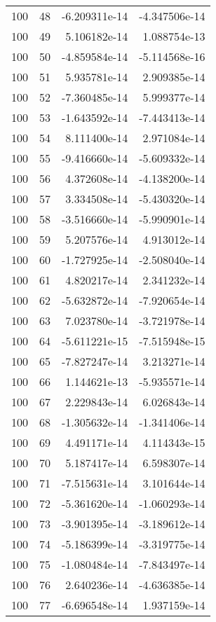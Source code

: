 \begin{tabular}{rrrr}
 100 &   48 & -6.209311e-14 & -4.347506e-14 \\
 100 &   49 &  5.106182e-14 &  1.088754e-13 \\
 100 &   50 & -4.859584e-14 & -5.114568e-16 \\
 100 &   51 &  5.935781e-14 &  2.909385e-14 \\
 100 &   52 & -7.360485e-14 &  5.999377e-14 \\
 100 &   53 & -1.643592e-14 & -7.443413e-14 \\
 100 &   54 &  8.111400e-14 &  2.971084e-14 \\
 100 &   55 & -9.416660e-14 & -5.609332e-14 \\
 100 &   56 &  4.372608e-14 & -4.138200e-14 \\
 100 &   57 &  3.334508e-14 & -5.430320e-14 \\
 100 &   58 & -3.516660e-14 & -5.990901e-14 \\
 100 &   59 &  5.207576e-14 &  4.913012e-14 \\
 100 &   60 & -1.727925e-14 & -2.508040e-14 \\
 100 &   61 &  4.820217e-14 &  2.341232e-14 \\
 100 &   62 & -5.632872e-14 & -7.920654e-14 \\
 100 &   63 &  7.023780e-14 & -3.721978e-14 \\
 100 &   64 & -5.611221e-15 & -7.515948e-15 \\
 100 &   65 & -7.827247e-14 &  3.213271e-14 \\
 100 &   66 &  1.144621e-13 & -5.935571e-14 \\
 100 &   67 &  2.229843e-14 &  6.026843e-14 \\
 100 &   68 & -1.305632e-14 & -1.341406e-14 \\
 100 &   69 &  4.491171e-14 &  4.114343e-15 \\
 100 &   70 &  5.187417e-14 &  6.598307e-14 \\
 100 &   71 & -7.515631e-14 &  3.101644e-14 \\
 100 &   72 & -5.361620e-14 & -1.060293e-14 \\
 100 &   73 & -3.901395e-14 & -3.189612e-14 \\
 100 &   74 & -5.186399e-14 & -3.319775e-14 \\
 100 &   75 & -1.080484e-14 & -7.843497e-14 \\
 100 &   76 &  2.640236e-14 & -4.636385e-14 \\
 100 &   77 & -6.696548e-14 &  1.937159e-14 \\

\end{tabular}
